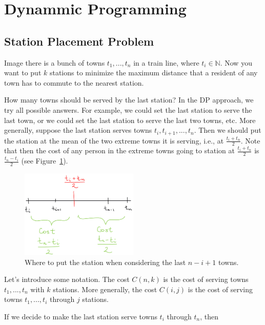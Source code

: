 
\section{Dynammic Programming}

\subsection{Station Placement Problem}

Image there is a bunch of towns $t_1, ..., t_n$ in a train line, where
$t_i \in \mathbb{N}$. Now you want to put $k$ stations to minimize
the maximum distance that a resident of any town has to commute to the nearest station. 

How many towns should be served by the last station? In the DP
approach, we try all possible answers. For example, we could set the
last station to serve the last town, or we could set the last station
to serve the last two towns, etc. More generally, suppose the last
station serves towns $t_i, t_{i + 1}, ..., t_n$. Then we should put
the station at the mean of the two extreme towns it is serving, i.e.,
at $\frac{t_i + t_n}{2}$. Note that then the cost of any person in the
extreme towns going to station at $\frac{t_i + t_n}{2}$ is
$\frac{t_n - t_i}{2}$ (see Figure~\ref{fig:stations}).


\begin{figure}[hpt]
    \centering
    \includegraphics[width=0.5\textwidth]{figures/stations.jpeg}
    \caption{Where to put the station when considering the last 
    $n - i + 1$ towns.}
    \label{fig:stations}
\end{figure}

Let's introduce some notation. The cost $C(n, k)$ is the cost of 
serving towns $t_1, ..., t_n$ with $k$ stations. More generally,
the cost $C(i, j)$ is the cost of serving towns $t_1, ..., t_i$
through $j$ stations.

If we decide to make the last station serve towns $t_i$ through
$t_n$, then 


